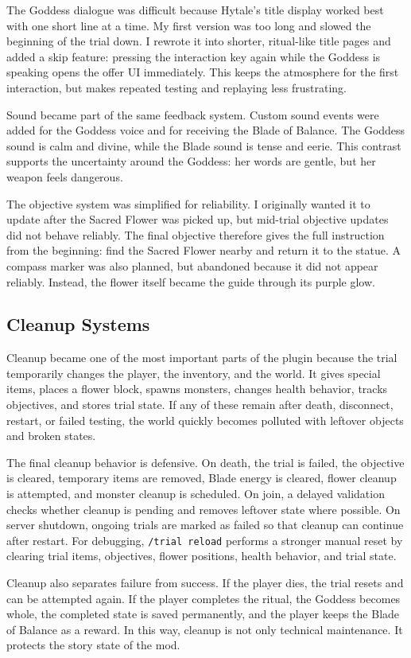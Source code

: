 The Goddess dialogue was difficult because Hytale's title display worked best
with one short line at a time.
My first version was too long and slowed the beginning of the trial down.
I rewrote it into shorter,
ritual-like title pages
and added a skip feature:
pressing the interaction key again while the Goddess is speaking
opens the offer UI immediately.
This keeps the atmosphere for the first interaction,
but makes repeated testing and replaying less frustrating.

Sound became part of the same feedback system.
Custom sound events were added for the Goddess voice
and for receiving the Blade of Balance.
The Goddess sound is calm and divine,
while the Blade sound is tense and eerie.
This contrast supports the uncertainty around the Goddess:
her words are gentle,
but her weapon feels dangerous.

The objective system was simplified for reliability.
I originally wanted it to update after the Sacred Flower was picked up,
but mid-trial objective updates did not behave reliably.
The final objective therefore gives the full instruction from the beginning:
find the Sacred Flower nearby and return it to the statue.
A compass marker was also planned,
but abandoned because it did not appear reliably.
Instead,
the flower itself became the guide through its purple glow.


\subsection{Cleanup Systems}

Cleanup became one of the most important parts of the plugin
because the trial temporarily changes the player,
the inventory,
and the world.
It gives special items,
places a flower block,
spawns monsters,
changes health behavior,
tracks objectives,
and stores trial state.
If any of these remain after death,
disconnect,
restart,
or failed testing,
the world quickly becomes polluted with leftover objects and broken states.

The final cleanup behavior is defensive.
On death,
the trial is failed,
the objective is cleared,
temporary items are removed,
Blade energy is cleared,
flower cleanup is attempted,
and monster cleanup is scheduled.
On join,
a delayed validation checks whether cleanup is pending
and removes leftover state where possible.
On server shutdown,
ongoing trials are marked as failed
so that cleanup can continue after restart.
For debugging,
\texttt{/trial reload} performs a stronger manual reset
by clearing trial items,
objectives,
flower positions,
health behavior,
and trial state.

Cleanup also separates failure from success.
If the player dies,
the trial resets and can be attempted again.
If the player completes the ritual,
the Goddess becomes whole,
the completed state is saved permanently,
and the player keeps the Blade of Balance as a reward.
In this way,
cleanup is not only technical maintenance.
It protects the story state of the mod.
